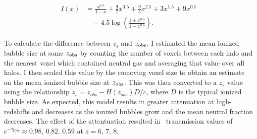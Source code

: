 \begin{align}
I \left(x \right) &= \frac{x^{4.5}}{1 - x} + \frac{9}{7}x^{3.5} + \frac{9}{5}x^{2.5} + 3 x^{1.5} + 9 x^{0.5} \nonumber \\
                & \hspace{1em}- 4.5 \log \left( \frac{1 + x^{0.5}}{1 - x^{0.5}}\right).
\end{align}

To calculate the difference between $z_s$ and $z_{\rm obs}$, I estimated the mean ionized bubble
size at some $z_{\rm obs}$ by counting the number of voxels between each halo and the nearest
voxel which contained neutral gas and averaging that value over all halos. I then scaled this value
by the comoving voxel size to obtain an estimate on the mean ionized bubble size at $z_{\rm obs}$. This was then
converted to a $z_s$ value using the relationship $z_{s} = z_{obs} - H\left(z_{obs} \right) D / c$, where
$D$ is the typical ionized bubble size. As expected, this model results in greater attenuation
at high-redshifts and decreases as the ionized bubbles grow and the mean neutral fraction decreases.
The effect of the attentuation resulted in \lya\ transmission values of
$e^{-\tau_{\textrm{Ly}\alpha}} \approx 0.98,\, 0.82,\, 0.59$ at $z = 6, \, 7,\, 8$.
